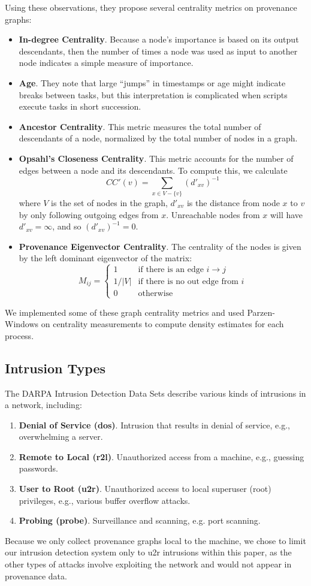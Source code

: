 \documentclass[10pt,twocolumn]{article}
\begin{document}
Using these observations, they propose several centrality metrics on provenance graphs:
\begin{itemize}
\item \textbf{In-degree Centrality}. Because a node's importance is based on its output descendants, then the number of times a node was used as input to another node indicates a simple measure of importance.
\item \textbf{Age}. They note that large ``jumps'' in timestamps or age might indicate breaks between tasks, but this interpretation is complicated when scripts execute tasks in short succession.
\item \textbf{Ancestor Centrality}. This metric measures the total number of descendants of a node, normalized by the total number of nodes in a graph.
\item \textbf{Opsahl's Closeness Centrality}. This metric accounts for the number of edges between a node and its descendants. To compute this, we calculate
$$CC'(v) = \sum_{x \in V -  \{v\}} (d'_{xv})^{-1}$$
where $V$ is the set of nodes in the graph, $d'_{xv}$ is the distance from node $x$ to $v$ by only following outgoing edges from $x$. Unreachable nodes from $x$ will have $d'_{xv} = \infty$, and so $(d'_{xv})^{-1} = 0$.
\item \textbf{Provenance Eigenvector Centrality}. The centrality of the nodes is given by the left dominant eigenvector of the matrix:
$$M_{ij} =
\begin{cases}
1 & \text{if there is an edge } i \to j \\
1/|V| & \text{if there is no out edge from } i \\
0 & \text{otherwise}
\end{cases}
$$
\end{itemize}
We implemented some of these graph centrality metrics and used Parzen-Windows on centrality measurements to compute density estimates for each process.

\subsection{Intrusion Types}

The DARPA Intrusion Detection Data Sets \cite{darpa} describe various kinds of intrusions in a network, including:
\begin{enumerate}
\item {\bf Denial of Service (dos)}. Intrusion that results in denial of service, e.g., overwhelming a server.
\item {\bf Remote to Local (r2l)}. Unauthorized access from a machine, e.g., guessing passwords.
\item {\bf User to Root (u2r)}. Unauthorized access to local superuser (root) privileges, e.g., various buffer overflow attacks.
\item {\bf Probing (probe)}. Surveillance and scanning, e.g. port scanning.
\end{enumerate}
Because we only collect provenance graphs local to the machine, we chose to limit our intrusion detection system only to u2r intrusions within this paper, as the other types of attacks involve exploiting the network and would not appear in provenance data.
\end{document}
